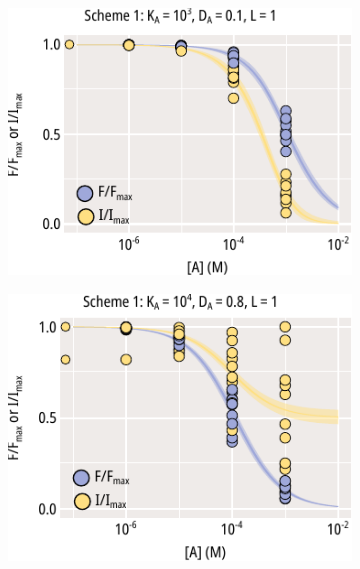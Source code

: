 \begin{figure}[h]
	\centering
	\begin{subfigure}[t]{0.3\textwidth}
		\caption{}\label{chxfig:scheme_1_ka_shift}
		\centering
		\includegraphics[width=\textwidth]{mwc_scheme_1_ka_shift.pdf}
	\end{subfigure}
	\hfill
	\begin{subfigure}[t]{0.3\textwidth}
		\caption{}\label{chxfig:scheme_1_da_shift}
		\centering
		\includegraphics[width=\textwidth]{mwc_scheme_1_da_shift.pdf}
	\end{subfigure}
	\hfill
	\begin{subfigure}[t]{0.3\textwidth}
		\caption{}\label{chxfig:scheme_1_l_shift}

\end{subfigure}
\end{figure}
